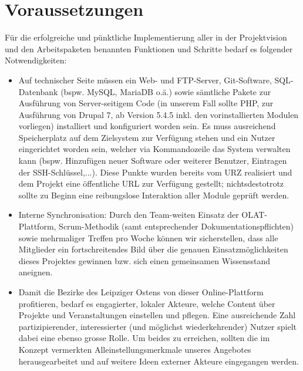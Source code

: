 \documentclass{swp}
\begin{document}
\section{Voraussetzungen}
F\"ur die erfolgreiche und p\"unktliche Implementierung aller in der Projektvision und den Arbeitspaketen benannten Funktionen und Schritte bedarf es folgender Notwendigkeiten:
\begin{itemize}
\item Auf technischer Seite m\"ussen ein Web- und FTP-Server, Git-Software, SQL-Datenbank (bspw. MySQL, MariaDB o.\"a.) sowie s\"amtliche Pakete zur Ausf\"uhrung von Server-seitigem Code (in unserem Fall sollte PHP, zur Ausf\"uhrung von Drupal 7, ab Version 5.4.5 inkl. den vorinstallierten Modulen vorliegen) installiert und konfiguriert worden sein. Es muss ausreichend Speicherplatz auf dem Zielsystem zur Verf\"ugung stehen und ein Nutzer eingerichtet worden sein, welcher via Kommandozeile das System verwalten kann (bspw. Hinzuf\"ugen neuer Software oder weiterer Benutzer, Eintragen der SSH-Schl\"ussel,...). Diese Punkte wurden bereits vom URZ realisiert und dem Projekt eine \"offentliche URL zur Verf\"ugung gestellt; nichtsdestotrotz sollte zu Beginn eine reibungslose Interaktion aller Module gepr\"uft werden.
\item Interne Synchronisation: Durch den Team-weiten Einsatz der OLAT-Plattform, Scrum-Methodik (samt entsprechender Dokumentationspflichten) sowie mehrmaliger Treffen pro Woche k\"onnen wir sicherstellen, dass alle Mitglieder ein fortschreitendes Bild \"uber die genauen Einsatzm\"oglichkeiten dieses Projektes gewinnen bzw. sich einen gemeinsamen Wissensstand aneignen.
\item Damit die Bezirke des Leipziger Ostens von dieser Online-Plattform profitieren, bedarf es engagierter, lokaler Akteure, welche Content \"uber Projekte und Veranstaltungen einstellen und pflegen. Eine ausreichende Zahl partizipierender, interessierter (und m\"oglichst wiederkehrender) Nutzer spielt dabei eine ebenso gro{ss}e Rolle. Um beides zu erreichen, sollten die im Konzept vermerkten Alleinstellungsmerkmale unseres Angebotes herausgearbeitet und auf weitere Ideen externer Akteure eingegangen werden.
\end{itemize}
\end{document}
